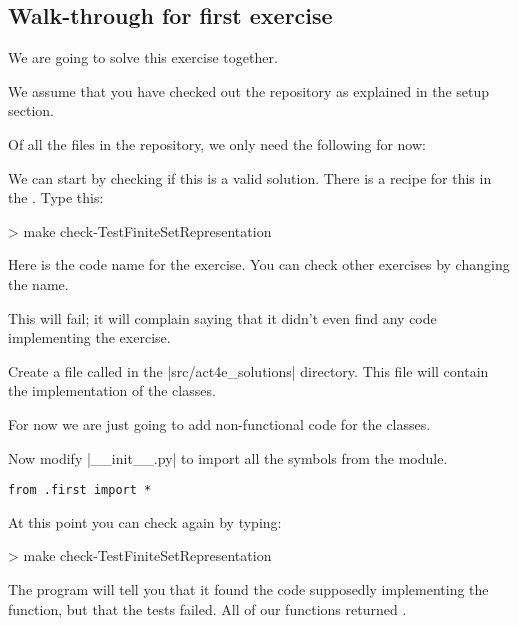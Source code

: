 \subsection{Walk-through for first exercise}

We are going to solve this exercise together.

We assume that you have checked out the repository as explained in the setup section.

Of all the files in the repository, we only need the following for now:
%
%



We can start by checking if this is a valid solution. There is a recipe for this in the .
Type this:

\begin{console}
  > make check-TestFiniteSetRepresentation
\end{console}

Here  is the code name for the exercise. You can check other exercises by changing the name.

This will fail; it will complain saying that it didn't even find any code implementing the exercise.


Create a file called  in the \files|src/act4e_solutions| directory.
This file will contain the implementation of the classes.

For now we are just going to add non-functional code for the classes.

\begin{widepar}
\end{widepar}
Now modify \files|__init__.py| to import all the symbols from the  module.

\begin{verbatim}
from .first import *
\end{verbatim}

At this point you can check again by typing:

\begin{console}
  > make check-TestFiniteSetRepresentation
\end{console}

The program will tell you that it found the code supposedly implementing the function,
but that the tests failed. All of our functions returned .

